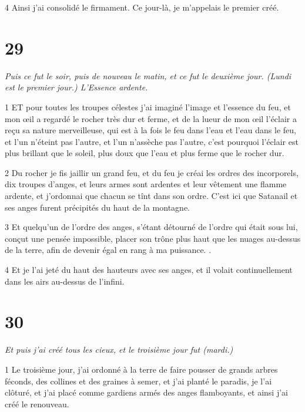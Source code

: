 \par 4 Ainsi j'ai consolidé le firmament. Ce jour-là, je m'appelais le premier créé.

\chapter{29}

\par \textit{Puis ce fut le soir, puis de nouveau le matin, et ce fut le deuxième jour. (Lundi est le premier jour.) L'Essence ardente.}

\par 1 ET pour toutes les troupes célestes j'ai imaginé l'image et l'essence du feu, et mon œil a regardé le rocher très dur et ferme, et de la lueur de mon œil l'éclair a reçu sa nature merveilleuse, qui est à la fois le feu dans l'eau et l'eau dans le feu, et l'un n'éteint pas l'autre, et l'un n'assèche pas l'autre, c'est pourquoi l'éclair est plus brillant que le soleil, plus doux que l'eau et plus ferme que le rocher dur.

\par 2 Du rocher je fis jaillir un grand feu, et du feu je créai les ordres des incorporels, dix troupes d'anges, et leurs armes sont ardentes et leur vêtement une flamme ardente, et j'ordonnai que chacun se tînt dans son ordre. C'est ici que Satanail et ses anges furent précipités du haut de la montagne.

\par 3 Et quelqu'un de l'ordre des anges, s'étant détourné de l'ordre qui était sous lui, conçut une pensée impossible, placer son trône plus haut que les nuages ​​​​au-dessus de la terre, afin de devenir égal en rang à ma puissance. .

\par 4 Et je l'ai jeté du haut des hauteurs avec ses anges, et il volait continuellement dans les airs au-dessus de l'infini.

\chapter{30}

\par \textit{Et puis j'ai créé tous les cieux, et le troisième jour fut (mardi.)}

\par 1 Le troisième jour, j'ai ordonné à la terre de faire pousser de grands arbres féconds, des collines et des graines à semer, et j'ai planté le paradis, je l'ai clôturé, et j'ai placé comme gardiens armés des anges flamboyants, et ainsi j'ai créé le renouveau.

